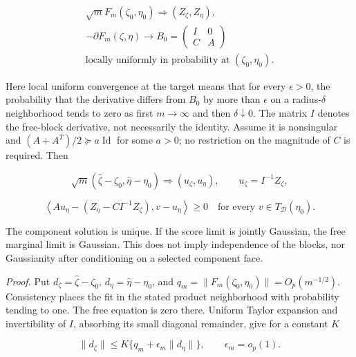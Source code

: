 \documentclass[11pt]{article}
\begin{document}
\begin{equation*}
\begin{gathered}
\sqrt m F_m(\zeta_0,\eta_0)\Rightarrow (Z_\zeta,Z_\eta), \\
-\partial F_m(\zeta,\eta)\longrightarrow
 B_0=\begin{pmatrix}I&0\\C&A\end{pmatrix} \\
\text{locally uniformly in probability at }(\zeta_0,\eta_0).
\end{gathered}
\end{equation*}

Here local uniform convergence at the target means that for every \(\epsilon>0\), the probability that the derivative differs from \(B_0\) by more than \(\epsilon\) on a radius-\(\delta\) neighborhood tends to zero as first \(m\to\infty\) and then \(\delta\downarrow0\). The matrix \(I\) denotes the free-block derivative, not necessarily the identity. Assume it is nonsingular and \((A+A^T)/2\succeq a\operatorname{Id}\) for some \(a>0\); no restriction on the magnitude of \(C\) is required. Then

\begin{equation*}
\sqrt m(\widehat\zeta-\zeta_0,\widehat\eta-\eta_0)
 \Rightarrow(u_\zeta,u_\eta),\qquad u_\zeta=I^{-1}Z_\zeta,
\end{equation*}

\begin{equation*}
\left\langle A u_\eta-(Z_\eta-CI^{-1}Z_\zeta),v-u_\eta\right\rangle\geq0
 \quad\text{for every }v\in T_{\mathcal D}(\eta_0).
\end{equation*}

The component solution is unique. If the score limit is jointly Gaussian, the free marginal limit is Gaussian. This does not imply independence of the blocks, nor Gaussianity after conditioning on a selected component face.

\emph{Proof.} Put \(d_\zeta=\widehat\zeta-\zeta_0\), \(d_\eta=\widehat\eta-\eta_0\), and \(q_m=\|F_m(\zeta_0,\eta_0)\|=O_p(m^{-1/2})\). Consistency places the fit in the stated product neighborhood with probability tending to one. The free equation is zero there. Uniform Taylor expansion and invertibility of \(I\), absorbing its small diagonal remainder, give for a constant \(K\)

\begin{equation*}
\|d_\zeta\|\leq K\{q_m+\epsilon_m\|d_\eta\|\},\qquad\epsilon_m=o_p(1).
\end{equation*}
\end{document}
